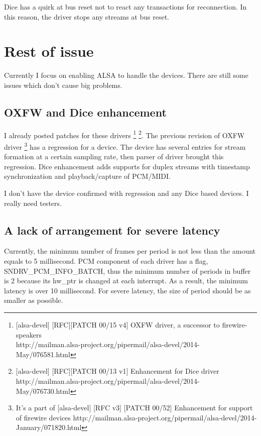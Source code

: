 \documentclass[onecolumn]{jarticle}
\begin{document}
Dice has a quirk at bus reset not to react any transactions for reconnection. In this reason, the driver stops any streams at bus reset.

\section{Rest of issue}

Currently I focus on enabling ALSA to handle the devices. There are still some issues which don't cause big problems.

\subsection{OXFW and Dice enhancement}

I already posted patches for these drivers \footnote{[alsa-devel] [RFC][PATCH 00/15 v4] OXFW driver, a successor to firewire-speakers \\ http://mailman.alsa-project.org/pipermail/alsa-devel/2014-May/076581.html} \footnote{[alsa-devel] [RFC][PATCH 00/13 v1] Enhancement for Dice driver \\ http://mailman.alsa-project.org/pipermail/alsa-devel/2014-May/076730.html}. The previous revision of OXFW driver \footnote{It's a part of [alsa-devel] [RFC v3] [PATCH 00/52] Enhancement for support of firewire devices http://mailman.alsa-project.org/pipermail/alsa-devel/2014-January/071820.html} has a regression for a device. The device has several entries for stream formation at a certain sampling rate, then parser of driver brought this regression. Dice enhancement adds supports for duplex streams with timestamp synchronization and playback/capture of PCM/MIDI.

I don't have the device confirmed with regression and any Dice based devices. I really need testers.

\subsection{A lack of arrangement for severe latency}
Currently, the minimum number of frames per period is not less than the amount equals to 5 millisecond. PCM component of each driver has a flag, SNDRV\_PCM\_INFO\_BATCH, thus the minimum number of periods in buffer is 2 because its hw\_ptr is changed at each interrupt. As a result, the minimum latency is over 10 millisecond. For severe latency, the size of period should be as smaller as possible.
\end{document}
